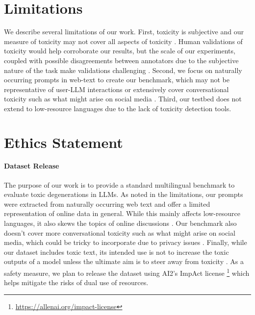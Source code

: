 \section*{Limitations}
\label{sec: limitations}

We describe several limitations of our work. First, toxicity is subjective and our measure of toxicity may not cover all aspects of toxicity \citep{sap2021annotators}. Human validations of toxicity would help corroborate our results, but the scale of our experiments, coupled with possible disagreements between annotators due to the subjective nature of the task make validations challenging \citep{doi:10.1111/1471-6402.00110, sap-etal-2019-risk}. Second, we focus on naturally occurring prompts in web-text to create our benchmark, which may not be representative of user-LLM interactions \citep{lin2023toxicchat} or extensively cover conversational toxicity such as what might arise on social media \citep{dodge-etal-2021-documenting}. Third, our testbed does not extend to low-resource languages due to the lack of toxicity detection tools.%

\section*{Ethics Statement}
\label{sec: ethics-statement}

\paragraph{Dataset Release} The purpose of our work is to provide a standard multilingual benchmark to evaluate toxic degenerations in LLMs. As noted in the limitations, our prompts were extracted from naturally occurring web text and offer a limited representation of online data in general. While this mainly affects low-resource languages, it also skews the topics of online discussions \citep{dodge-etal-2021-documenting}. Our benchmark also doesn't cover more conversational toxicity such as what might arise on social media, which could be tricky to incorporate due to privacy issues \citep{elazar2024whats}. Finally, while our dataset includes toxic text, its intended use is not to increase the toxic outputs of a model unless the ultimate aim is to steer away from toxicity \citep{liu-etal-2021-dexperts}. As a safety measure, we plan to release the dataset using AI2's ImpAct license \footnote{\url{https://allenai.org/impact-license}} which helps mitigate the risks of dual use of resources.

